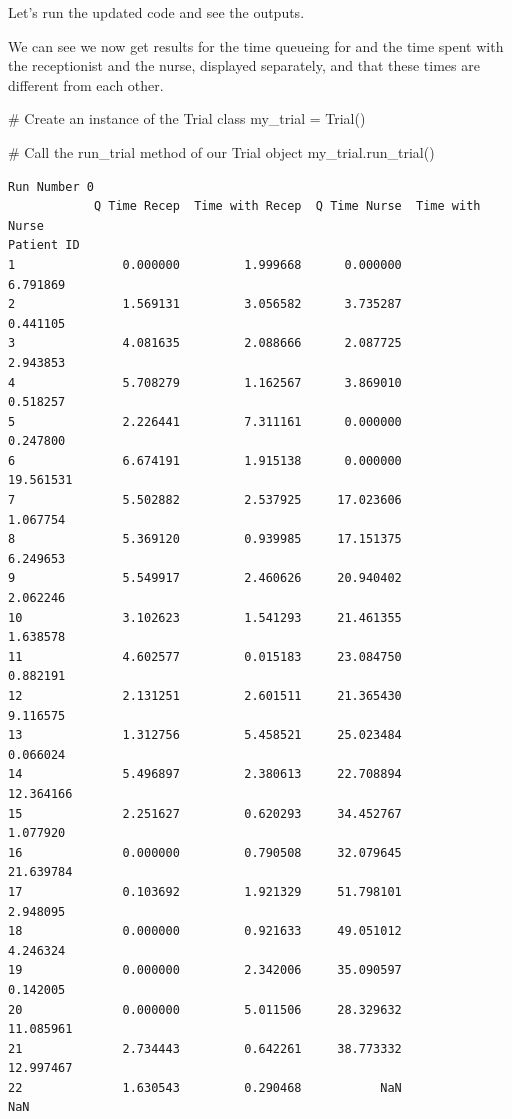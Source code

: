 \documentclass[
  letterpaper,
  DIV=11,
  numbers=noendperiod]{scrreprt}
\newenvironment{Shaded}{\begin{snugshade}}{\end{snugshade}}
\newcommand{\CommentTok}[1]{\textcolor[rgb]{0.37,0.37,0.37}{#1}}
\newcommand{\NormalTok}[1]{\textcolor[rgb]{0.00,0.23,0.31}{#1}}
\newcommand{\OperatorTok}[1]{\textcolor[rgb]{0.37,0.37,0.37}{#1}}
\begin{document}
Let's run the updated code and see the outputs.

We can see we now get results for the time queueing for and the time
spent with the receptionist and the nurse, displayed separately, and
that these times are different from each other.

\begin{Shaded}
\begin{Highlighting}[]
\CommentTok{\# Create an instance of the Trial class}
\NormalTok{my\_trial }\OperatorTok{=}\NormalTok{ Trial()}

\CommentTok{\# Call the run\_trial method of our Trial object}
\NormalTok{my\_trial.run\_trial()}
\end{Highlighting}
\end{Shaded}

\begin{verbatim}
Run Number 0
            Q Time Recep  Time with Recep  Q Time Nurse  Time with Nurse
Patient ID                                                              
1               0.000000         1.999668      0.000000         6.791869
2               1.569131         3.056582      3.735287         0.441105
3               4.081635         2.088666      2.087725         2.943853
4               5.708279         1.162567      3.869010         0.518257
5               2.226441         7.311161      0.000000         0.247800
6               6.674191         1.915138      0.000000        19.561531
7               5.502882         2.537925     17.023606         1.067754
8               5.369120         0.939985     17.151375         6.249653
9               5.549917         2.460626     20.940402         2.062246
10              3.102623         1.541293     21.461355         1.638578
11              4.602577         0.015183     23.084750         0.882191
12              2.131251         2.601511     21.365430         9.116575
13              1.312756         5.458521     25.023484         0.066024
14              5.496897         2.380613     22.708894        12.364166
15              2.251627         0.620293     34.452767         1.077920
16              0.000000         0.790508     32.079645        21.639784
17              0.103692         1.921329     51.798101         2.948095
18              0.000000         0.921633     49.051012         4.246324
19              0.000000         2.342006     35.090597         0.142005
20              0.000000         5.011506     28.329632        11.085961
21              2.734443         0.642261     38.773332        12.997467
22              1.630543         0.290468           NaN              NaN

\end{verbatim}
\end{document}
